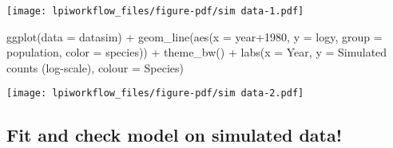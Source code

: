 \documentclass[
  letterpaper,
  DIV=11,
  numbers=noendperiod]{scrartcl}
\newenvironment{Shaded}{\begin{snugshade}}{\end{snugshade}}
\newcommand{\AttributeTok}[1]{\textcolor[rgb]{0.40,0.45,0.13}{#1}}
\newcommand{\DecValTok}[1]{\textcolor[rgb]{0.68,0.00,0.00}{#1}}
\newcommand{\FunctionTok}[1]{\textcolor[rgb]{0.28,0.35,0.67}{#1}}
\newcommand{\NormalTok}[1]{\textcolor[rgb]{0.00,0.23,0.31}{#1}}
\newcommand{\OtherTok}[1]{\textcolor[rgb]{0.00,0.23,0.31}{#1}}
\newcommand{\SpecialCharTok}[1]{\textcolor[rgb]{0.37,0.37,0.37}{#1}}
\newcommand{\StringTok}[1]{\textcolor[rgb]{0.13,0.47,0.30}{#1}}
\begin{document}
\begin{Shaded}
\end{Shaded}

\texttt{[image: lpiworkflow\_files/figure-pdf/sim data-1.pdf]}

\begin{Shaded}
\begin{Highlighting}[]
\FunctionTok{ggplot}\NormalTok{(}\AttributeTok{data =}\NormalTok{ datasim) }\SpecialCharTok{+}
  \FunctionTok{geom\_line}\NormalTok{(}\FunctionTok{aes}\NormalTok{(}\AttributeTok{x =}\NormalTok{ year}\SpecialCharTok{+}\DecValTok{1980}\NormalTok{, }\AttributeTok{y =}\NormalTok{ logy, }
                \AttributeTok{group =}\NormalTok{ population,}
                \AttributeTok{color =}\NormalTok{ species)) }\SpecialCharTok{+}
  \FunctionTok{theme\_bw}\NormalTok{() }\SpecialCharTok{+}
  \FunctionTok{labs}\NormalTok{(}\AttributeTok{x =} \StringTok{\textquotesingle{}Year\textquotesingle{}}\NormalTok{, }\AttributeTok{y =} \StringTok{\textquotesingle{}Simulated counts (log{-}scale)\textquotesingle{}}\NormalTok{, }\AttributeTok{colour =} \StringTok{\textquotesingle{}Species\textquotesingle{}}\NormalTok{)}
\end{Highlighting}
\end{Shaded}

\texttt{[image: lpiworkflow\_files/figure-pdf/sim data-2.pdf]}

\subsection{Fit and check model on simulated
data!}\label{fit-and-check-model-on-simulated-data}
\end{document}
